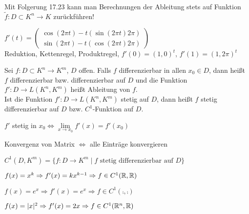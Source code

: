 	\begin{bemerkung}
		Mit Folgerung 17.23 kann man Berechnungen der Ableitung stets auf Funktion $\tilde f:D\subset
		K^n\to K$ zurückführen!
	\end{bemerkung}

	\begin{beispiel}[$f:\real\to\real^2$ mit $f(t)=\begin{pmatrix}t\cos (2\pi t) \\ t\sin(2\pi t) \end{pmatrix}$]
		$f'(t)=\begin{pmatrix}\cos(2\pi t)-t(\sin(2\pi t)2\pi) \\ \sin(2\pi t)-t(\cos(2\pi t)2\pi)\end{pmatrix}$ \\
		Reduktion, Kettenregel, Produktregel, $f'(0)=(1,0)^t$, $f'(1)=(1,2\pi)^t$
	\end{beispiel}

	\begin{definition}
		Sei $f:D\subset K^n\to K^m$, $D$ offen. Falls $f$ differenzierbar in allen $x_0\in D$, dann 
		heißt $f$ differenzierbar bzw. differenzierbar auf $D$ und die Funktion $f':D\to L(K^n,K^m)$ 
		heißt Ableitung von $f$. \\
		Ist die Funktion $f':D\to L(K^n,K^m)$ stetig auf $D$, dann heißt $f$ stetig differenzierbar auf 
		$D$ bzw. $C^1$-Funktion auf $D$.
	\end{definition}

	\begin{ueberblick}
		\begin{compactitem}
			\item $f'$ stetig in $x_0\iff \lim\limits_{x\to x_0}f'(x)=f'(x_0)$
			\item Konvergenz von Matrix $\iff$ alle Einträge konvergieren
			\item $C^1(D,K^m)=\{f:D\to K^m \mid f \text{ stetig differenzierbar auf }D\}$
		\end{compactitem}
	\end{ueberblick}

	\begin{beispiel}
		\begin{compactitem}
			\item $f(x)=x^k\Rightarrow f'(x)=kx^{k-1}\Rightarrow f\in C^1(\mathbb{R},\mathbb{R})$
			\item $f(x)=e^x\Rightarrow f'(x)=e^x\Rightarrow f\in C^1(\comp,\comp)$
			\item $f(x)=|x|^2\Rightarrow f'(x)=2x\Rightarrow f\in C^1(\mathbb{R}^n,\mathbb{R})$
		\end{compactitem}
	\end{beispiel}

